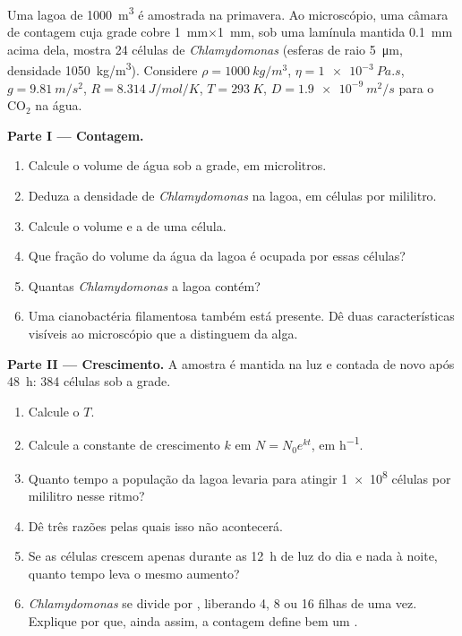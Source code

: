 \begin{problem}
\label{pb:b2:unicellular-diversity:1}
Uma lagoa de \qty{1000}{m^3} é amostrada na primavera. Ao microscópio,
uma câmara de contagem cuja grade cobre \qty{1}{mm}$\times$\qty{1}{mm},
sob uma lamínula mantida \qty{0.1}{mm} acima dela, mostra 24 células
de \emph{Chlamydomonas} (esferas de raio \qty{5}{\micro m}, densidade
\qty{1050}{kg/m^3}). Considere $\rho = \qty{1000}{kg/m^3}$,
$\eta = \qty{1e-3}{Pa.s}$, $g = \qty{9.81}{m/s^2}$, $R =
\qty{8.314}{J/mol/K}$, $T = \qty{293}{K}$, $D = \qty{1.9e-9}{m^2/s}$
para o $\mathrm{CO_2}$ na água.

\medskip
\noindent\textbf{Parte I --- Contagem.}
\begin{enumerate}
  \item Calcule o volume de água sob a grade, em microlitros.
  \item Deduza a densidade de \emph{Chlamydomonas} na lagoa, em
        células por mililitro.
  \item Calcule o volume e a  de uma célula.
  \item Que fração do volume da água da lagoa é ocupada por essas
        células?
  \item Quantas \emph{Chlamydomonas} a lagoa contém?
  \item Uma cianobactéria filamentosa também está presente. Dê duas
        características visíveis ao microscópio que a distinguem da
        alga.
\end{enumerate}

\medskip
\noindent\textbf{Parte II --- Crescimento.}
A amostra é mantida na luz e contada de novo após \qty{48}{h}:
\num{384} células sob a grade.
\begin{enumerate}[resume]
  \item Calcule o  $T$.
  \item Calcule a constante de crescimento $k$ em $N = N_0 e^{kt}$, em
        \unit{h^{-1}}.
  \item Quanto tempo a população da lagoa levaria para atingir
        \qty{1e8}{} células por mililitro nesse ritmo?
  \item Dê três razões pelas quais isso não acontecerá.
  \item Se as células crescem apenas durante as \qty{12}{h} de luz do
        dia e nada à noite, quanto tempo leva o mesmo aumento?
  \item \emph{Chlamydomonas} se divide por , liberando
        4, 8 ou 16 filhas de uma vez. Explique por que, ainda assim, a
        contagem define bem um .
\end{enumerate}


\end{problem}
